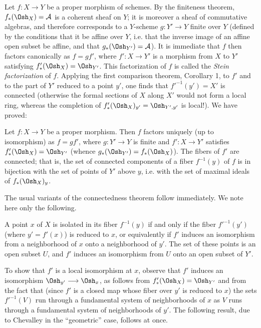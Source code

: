 Let $f:X\longrightarrow Y$ be a proper morphism of schemes. By the finiteness
theorem, $f_*(\Osh_X)=\mathcal A$ is a coherent sheaf on $Y$; it is moreover
a sheaf of commutative algebras, and therefore corresponds to a $Y$-scheme
$g:Y'\longrightarrow Y$ finite over $Y$ (defined by the conditions that it be
affine over $Y$, i.e. that the inverse image of an affine open subset be
affine, and that $g_*(\Osh_{Y'})=\mathcal A$). It is immediate that $f$ then
factors canonically as $f=gf'$, where $f':X\longrightarrow Y'$ is a morphism
from $X$ to $Y'$ satisfying $f'_*(\Osh_X)=\Osh_{Y'}$. This factorization of
$f$ is called the \emph{Stein factorization} of $f$. Applying the first
comparison theorem, Corollary 1, to $f'$ and to the part of $Y'$ reduced to a
point $y'$, one finds that $f'^{-1}(y')=X'$ is connected (otherwise the formal
sections of $X$ along $X'$ would not form a local ring, whereas the completion
of $f'_*(\Osh_X)_{y'}=\Osh_{Y',y'}$ is local!). We have proved:

 Let
$f:X\longrightarrow Y$ be a proper morphism. Then $f$ factors uniquely (up to
isomorphism) as $f=gf'$, where $g:Y'\longrightarrow Y$ is finite and
$f':X\longrightarrow Y'$ satisfies $f'_*(\Osh_X)=\Osh_{Y'}$ (whence
$g_*(\Osh_{Y'})=f_*(\Osh_X)$). The fibers of $f'$ are connected; that is, the
set of connected components of a fiber $f^{-1}(y)$ of $f$ is in bijection
with the set of points of $Y'$ above $y$, i.e. with the set of maximal ideals
of $f_*(\Osh_X)_y$.

The usual variants of the connectedness theorem follow immediately. We note
here only the following.

 A point $x$ of $X$ is isolated in its fiber
$f^{-1}(y)$ if and only if the fiber $f'^{-1}(y')$ (where $y'=f'(x)$) is
reduced to $x$, or equivalently if $f'$ induces an isomorphism from a
neighborhood of $x$ onto a neighborhood of $y'$. The set of these points is
an open subset $U$, and $f'$ induces an isomorphism from $U$ onto an open
subset of $Y'$.

To show that $f'$ is a local isomorphism at $x$, observe that $f'$ induces an
isomorphism $\Osh_{y'}\longrightarrow\Osh_x$, as follows from
$f'_*(\Osh_X)=\Osh_{Y'}$ and from the fact that (since $f'$ is a closed map
whose fiber over $y'$ is reduced to $x$) the sets $f'^{-1}(V)$ run through a
fundamental system of neighborhoods of $x$ as $V$ runs through a fundamental
system of neighborhoods of $y'$. The following result, due to Chevalley in the
“geometric” case, follows at once.

